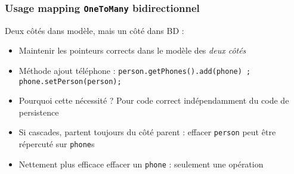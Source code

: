 \documentclass[english, french]{beamer}
\begin{document}
\begin{frame}
	\frametitle{Usage mapping \texttt{OneToMany} bidirectionnel}
	Deux côtés dans modèle, mais un côté dans BD :\par
	{\centering
		\par
	}
	
	\begin{itemize}
		\item Maintenir les pointeurs corrects dans le modèle des \emph{deux côtés}
		\item Méthode ajout téléphone : \texttt{person.getPhones().add(phone) ; phone.setPerson(person);}
		\item Pourquoi cette nécessité ? \pause Pour code correct indépendamment du code de persistence \pause
		\item Si cascades, partent toujours du côté parent {\tiny : effacer \texttt{person} peut être répercuté sur \texttt{phone}s}
		\item Nettement plus efficace {\tiny effacer un \texttt{phone} : seulement une opération}%
	\end{itemize}
\end{frame}
\end{document}
